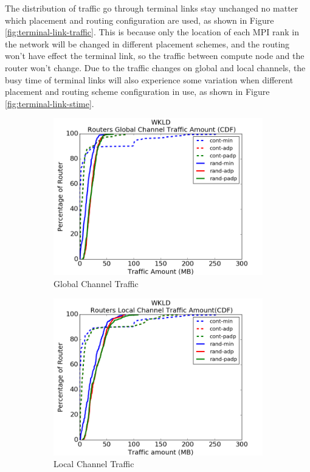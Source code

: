 \documentclass[conference,compsoc]{IEEEtran}
\begin{document}
The distribution of traffic go through terminal links stay unchanged no matter which placement and routing configuration are used, as shown in Figure \ref{fig:terminal-link-traffic}. This is because only the location of each MPI rank in the network will be changed in different placement schemes, and the routing won't have effect the terminal link, so the traffic between compute node and the router won't change. Due to the traffic changes on global and local channels, the busy time of terminal links will also experience some variation when different placement and routing scheme configuration in use, as shown in Figure \ref{fig:terminal-link-stime}. 


 
\begin{figure}[t!]
    \centering
    \begin{subfigure}[t]{0.32\textwidth}
        \centering
        \includegraphics[height=1.8 in]{wkld/gc-traffic}
        \caption{Global Channel Traffic}
        \label{fig:global-channel-traffic}
    \end{subfigure}%
    \hspace{1em}%
    \begin{subfigure}[t]{0.32\textwidth}
        \centering
        \includegraphics[height=1.8 in]{wkld/lc-traffic}
        \caption{Local Channel Traffic}
        \label{fig:local-channel-traffic}
    \end{subfigure}%
    \hspace{1em}%
    \begin{subfigure}[t]{0.32\textwidth}

\end{subfigure}
\end{figure}
\end{document}
